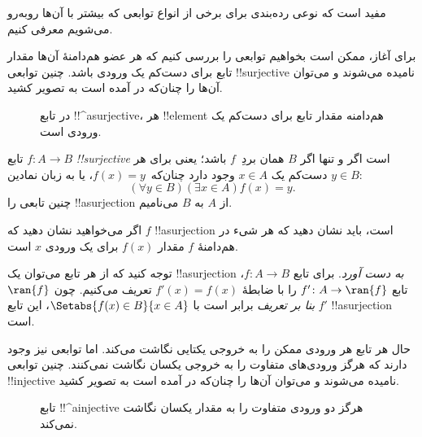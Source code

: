 \documentclass[../../../include/open-logic-section]{subfiles}
\begin{document}

\begin{explain}
مفید است که نوعی رده‌بندی برای برخی از
انواع توابعی که بیشتر با آن‌ها روبه‌رو می‌شویم معرفی کنیم.

برای آغاز، ممکن است بخواهیم توابعی را بررسی کنیم که هر عضو
هم‌دامنهٔ آن‌ها مقدار تابع برای دست‌کم یک ورودی باشد. چنین
توابعی !!{surjective} نامیده می‌شوند و می‌توان آن‌ها را چنان‌که در
 آمده است به تصویر کشید.

\begin{figure}
  \caption{در تابع !!^a{surjective}، هر !!{element} هم‌دامنه
    مقدار تابع برای دست‌کم یک ورودی است.}
\end{figure}
\end{explain}

\begin{defn}
تابع $f \colon A \rightarrow B$ \emph{!!{surjective}} است اگر و تنها اگر $B$
همان بردِ~$f$ باشد؛ یعنی برای هر $y \in B$ دست‌کم
یک $x \in A$ وجود دارد چنان‌که~$f(x) = y$، یا به زبان نمادین:
\[
  (\forall y \in B)(\exists x \in A)f(x) = y.
\]
چنین تابعی را !!a{surjection} از $A$ به $B$ می‌نامیم.
\end{defn}

\begin{explain}
اگر می‌خواهید نشان دهید که $f$ !!a{surjection} است، باید نشان دهید
که هر شیء در هم‌دامنهٔ $f$ مقدار $f(x)$ برای یک
ورودی $x$ است.

توجه کنید که از هر تابع می‌توان یک !!a{surjection} \emph{به دست آورد}.
برای تابع $f \colon A \to B$، تابع $f' \colon A \to \ran{f}$ را با
ضابطهٔ $f'(x) = f(x)$ تعریف می‌کنیم. چون $\ran{f}$ \emph{بنا بر تعریف} برابر است با
$\Setabs{f(x) \in B}{x \in A}$، این تابع $f'$
!!a{surjection} است.
\end{explain}

\begin{explain}
حال هر تابع هر ورودی ممکن را به خروجی یکتایی نگاشت می‌کند. اما
توابعی نیز وجود دارند که هرگز ورودی‌های متفاوت را به
خروجی یکسان نگاشت نمی‌کنند. چنین توابعی !!{injective} نامیده می‌شوند و می‌توان آن‌ها را
چنان‌که در  آمده است به تصویر کشید.
\begin{figure}
  \caption{تابع !!^a{injective} هرگز دو
    ورودی متفاوت را به مقدار یکسان نگاشت نمی‌کند.}
\end{figure}
\end{explain}
\end{document}
